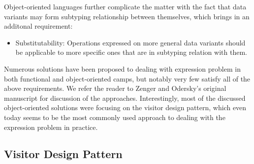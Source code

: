 \documentclass[preprint]{sigplanconf}
\begin{document}

\noindent
Object-oriented languages further complicate the matter with the fact that 
data variants may form subtyping relationship between themselves, which brings 
in an additonal requirement:

\begin{itemize}
\item Substitutability: Operations expressed on more general data variants 
      should be applicable to more specific ones that are in subtyping relation 
      with them.
\end{itemize}


\noindent
Numerous solutions have been proposed to dealing with expression problem in both 
functional and object-oriented camps, but notably very few satisfy all of the 
above requirements. We refer the reader to Zenger and Odersky's original 
manuscript for discussion of the approaches\cite{fool12}. Interestingly, most of 
the discussed object-oriented solutions were focusing on the visitor design 
pattern, which even today seems to be the most commonly used approach to dealing 
with the expression problem in practice.

\subsection{Visitor Design Pattern}
\label{sec:vdp}

\end{document}
